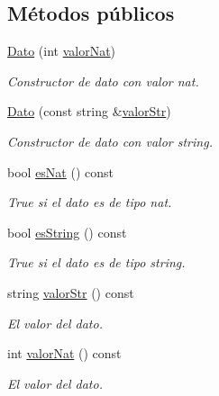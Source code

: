 \subsection*{Métodos públicos}
\begin{DoxyCompactItemize}
\item 
\hyperlink{classDato_aeb115751623b17f5cc61199c45dd6fb4}{Dato} (int \hyperlink{classDato_a417fa8d0766c8ac1221c553b0f31ba93}{valor\-Nat})
\begin{DoxyCompactList}\small\item\em Constructor de dato con valor nat. \end{DoxyCompactList}\item 
\hyperlink{classDato_a3b8e8b3472eee6374487378e865e3428}{Dato} (const string \&\hyperlink{classDato_ac1ece791ad4cc21764a89ffac254add8}{valor\-Str})
\begin{DoxyCompactList}\small\item\em Constructor de dato con valor string. \end{DoxyCompactList}\item 
bool \hyperlink{classDato_a815f643cd190da9ddf25e1c91d0eb7fa}{es\-Nat} () const 
\begin{DoxyCompactList}\small\item\em True si el dato es de tipo nat. \end{DoxyCompactList}\item 
bool \hyperlink{classDato_a25bc3327023f6d84729d64d61800937b}{es\-String} () const 
\begin{DoxyCompactList}\small\item\em True si el dato es de tipo string. \end{DoxyCompactList}\item 
string \hyperlink{classDato_ac1ece791ad4cc21764a89ffac254add8}{valor\-Str} () const 
\begin{DoxyCompactList}\small\item\em El valor del dato. \end{DoxyCompactList}\item 
int \hyperlink{classDato_a417fa8d0766c8ac1221c553b0f31ba93}{valor\-Nat} () const 
\begin{DoxyCompactList}\small\item\em El valor del dato. \end{DoxyCompactList}\end{DoxyCompactItemize}
